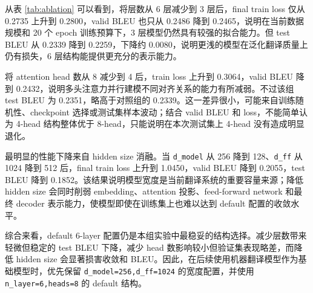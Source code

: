 ﻿\documentclass[UTF8,a4paper,12pt]{ctexart}
\begin{document}
\begin{table}[H]
\centering
\caption{Transformer 结构消融实验结果（peak lr = $7\times10^{-4}$）}
\label{tab:ablation}
\end{table}

从表 \ref{tab:ablation} 可以看到，将层数从 6 层减少到 3 层后，final train loss 仅从 0.2735 上升到 0.2800，valid BLEU 也只从 0.2486 降到 0.2465，说明在当前数据规模和 20 个 epoch 训练预算下，3 层模型仍然具有较强的拟合能力。但 test BLEU 从 0.2339 降到 0.2259，下降约 0.0080，说明更浅的模型在泛化翻译质量上仍有损失，6 层结构能提供更充分的表示能力。

将 attention head 数从 8 减少到 4 后，train loss 上升到 0.3064，valid BLEU 降到 0.2432，说明多头注意力并行建模不同对齐关系的能力有所减弱。不过该组 test BLEU 为 0.2351，略高于对照组的 0.2339。这一差异很小，可能来自训练随机性、checkpoint 选择或测试集样本波动；结合 valid BLEU 和 loss，不能简单认为 4-head 结构整体优于 8-head，只能说明在本次测试集上 4-head 没有造成明显退化。

最明显的性能下降来自 hidden size 消融。当 \texttt{d\_model} 从 256 降到 128、\texttt{d\_ff} 从 1024 降到 512 后，final train loss 上升到 1.0450，valid BLEU 降到 0.2055，test BLEU 降到 0.1852。该结果说明模型宽度是当前翻译系统的重要容量来源；降低 hidden size 会同时削弱 embedding、attention 投影、feed-forward network 和最终 decoder 表示能力，使模型即使在训练集上也难以达到 default 配置的收敛水平。

综合来看，default 6-layer 配置仍是本组实验中最稳妥的结构选择。减少层数带来轻微但稳定的 test BLEU 下降，减少 head 数影响较小但验证集表现略差，而降低 hidden size 会显著损害收敛和 BLEU。因此，在后续使用机器翻译模型作为基础模型时，优先保留 \texttt{d\_model=256,d\_ff=1024} 的宽度配置，并使用 \texttt{n\_layer=6,heads=8} 的 default 结构。
\end{document}
